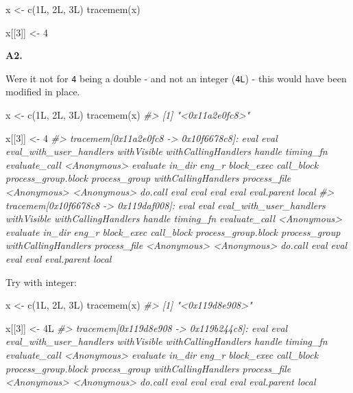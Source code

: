 \documentclass[
]{book}
\newenvironment{Shaded}{\begin{snugshade}}{\end{snugshade}}
\newcommand{\CommentTok}[1]{\textcolor[rgb]{0.56,0.35,0.01}{\textit{#1}}}
\newcommand{\DecValTok}[1]{\textcolor[rgb]{0.00,0.00,0.81}{#1}}
\newcommand{\FunctionTok}[1]{\textcolor[rgb]{0.00,0.00,0.00}{#1}}
\newcommand{\NormalTok}[1]{#1}
\newcommand{\OtherTok}[1]{\textcolor[rgb]{0.56,0.35,0.01}{#1}}
\begin{document}
\begin{Shaded}
\begin{Highlighting}[]
\NormalTok{x }\OtherTok{\textless{}{-}} \FunctionTok{c}\NormalTok{(1L, 2L, 3L)}
\FunctionTok{tracemem}\NormalTok{(x)}

\NormalTok{x[[}\DecValTok{3}\NormalTok{]] }\OtherTok{\textless{}{-}} \DecValTok{4}
\end{Highlighting}
\end{Shaded}

\textbf{A2.}

Were it not for \texttt{4} being a double - and not an integer (\texttt{4L}) - this would have been modified in place.

\begin{Shaded}
\begin{Highlighting}[]
\NormalTok{x }\OtherTok{\textless{}{-}} \FunctionTok{c}\NormalTok{(1L, 2L, 3L)}
\FunctionTok{tracemem}\NormalTok{(x)}
\CommentTok{\#\textgreater{} [1] "\textless{}0x11a2e0fc8\textgreater{}"}

\NormalTok{x[[}\DecValTok{3}\NormalTok{]] }\OtherTok{\textless{}{-}} \DecValTok{4}
\CommentTok{\#\textgreater{} tracemem[0x11a2e0fc8 {-}\textgreater{} 0x10f6678c8]: eval eval eval\_with\_user\_handlers withVisible withCallingHandlers handle timing\_fn evaluate\_call \textless{}Anonymous\textgreater{} evaluate in\_dir eng\_r block\_exec call\_block process\_group.block process\_group withCallingHandlers process\_file \textless{}Anonymous\textgreater{} \textless{}Anonymous\textgreater{} do.call eval eval eval eval eval.parent local }
\CommentTok{\#\textgreater{} tracemem[0x10f6678c8 {-}\textgreater{} 0x119daf008]: eval eval eval\_with\_user\_handlers withVisible withCallingHandlers handle timing\_fn evaluate\_call \textless{}Anonymous\textgreater{} evaluate in\_dir eng\_r block\_exec call\_block process\_group.block process\_group withCallingHandlers process\_file \textless{}Anonymous\textgreater{} \textless{}Anonymous\textgreater{} do.call eval eval eval eval eval.parent local}
\end{Highlighting}
\end{Shaded}

Try with integer:

\begin{Shaded}
\begin{Highlighting}[]
\NormalTok{x }\OtherTok{\textless{}{-}} \FunctionTok{c}\NormalTok{(1L, 2L, 3L)}
\FunctionTok{tracemem}\NormalTok{(x)}
\CommentTok{\#\textgreater{} [1] "\textless{}0x119d8e908\textgreater{}"}

\NormalTok{x[[}\DecValTok{3}\NormalTok{]] }\OtherTok{\textless{}{-}}\NormalTok{ 4L}
\CommentTok{\#\textgreater{} tracemem[0x119d8e908 {-}\textgreater{} 0x119b244c8]: eval eval eval\_with\_user\_handlers withVisible withCallingHandlers handle timing\_fn evaluate\_call \textless{}Anonymous\textgreater{} evaluate in\_dir eng\_r block\_exec call\_block process\_group.block process\_group withCallingHandlers process\_file \textless{}Anonymous\textgreater{} \textless{}Anonymous\textgreater{} do.call eval eval eval eval eval.parent local}
\end{Highlighting}
\end{Shaded}
\end{document}
